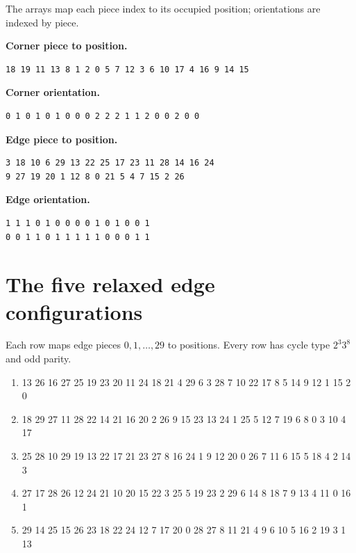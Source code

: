 \documentclass[11pt]{article}
\theoremstyle{definition}
\begin{document}
The arrays map each piece index to its occupied position; orientations are indexed by piece.

\noindent\textbf{Corner piece to position.}
\begin{lstlisting}
18 19 11 13 8 1 2 0 5 7 12 3 6 10 17 4 16 9 14 15
\end{lstlisting}
\noindent\textbf{Corner orientation.}
\begin{lstlisting}
0 1 0 1 0 1 0 0 0 2 2 2 1 1 2 0 0 2 0 0
\end{lstlisting}
\noindent\textbf{Edge piece to position.}
\begin{lstlisting}
3 18 10 6 29 13 22 25 17 23 11 28 14 16 24
9 27 19 20 1 12 8 0 21 5 4 7 15 2 26
\end{lstlisting}
\noindent\textbf{Edge orientation.}
\begin{lstlisting}
1 1 1 0 1 0 0 0 0 1 0 1 0 0 1
0 0 1 1 0 1 1 1 1 1 0 0 0 1 1
\end{lstlisting}

\section{The five relaxed edge configurations}\label{app:five-configurations}

Each row maps edge pieces $0,1,\ldots,29$ to positions.  Every row has cycle type $2^3 3^8$ and odd parity.

\begin{enumerate}[leftmargin=2em]
\item {\ttfamily\footnotesize\raggedright 13 26 16 27 25 19 23 20 11 24 18 21 4 29 6 3 28 7 10 22 17 8 5 14 9 12 1 15 2 0\par}
\item {\ttfamily\footnotesize\raggedright 18 29 27 11 28 22 14 21 16 20 2 26 9 15 23 13 24 1 25 5 12 7 19 6 8 0 3 10 4 17\par}
\item {\ttfamily\footnotesize\raggedright 25 28 10 29 19 13 22 17 21 23 27 8 16 24 1 9 12 20 0 26 7 11 6 15 5 18 4 2 14 3\par}
\item {\ttfamily\footnotesize\raggedright 27 17 28 26 12 24 21 10 20 15 22 3 25 5 19 23 2 29 6 14 8 18 7 9 13 4 11 0 16 1\par}
\item {\ttfamily\footnotesize\raggedright 29 14 25 15 26 23 18 22 24 12 7 17 20 0 28 27 8 11 21 4 9 6 10 5 16 2 19 3 1 13\par}
\end{enumerate}
\end{document}
